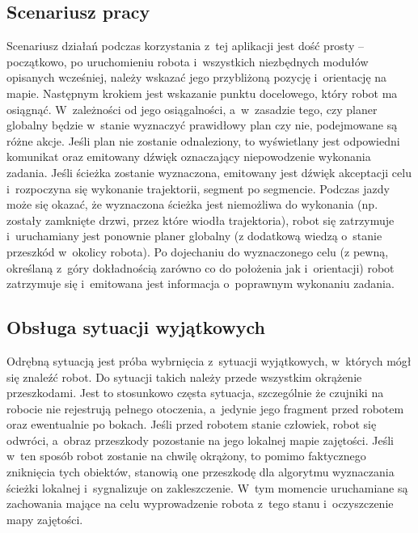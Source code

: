 \subsection{Scenariusz pracy}

Scenariusz działań podczas korzystania z~tej aplikacji jest dość prosty -- początkowo,
po uruchomieniu robota i~wszystkich niezbędnych modułów opisanych wcześniej, należy
wskazać jego przybliżoną pozycję i~orientację na mapie. Następnym krokiem jest
wskazanie punktu docelowego, który robot ma osiągnąć. W~zależności od jego osiągalności,
a~w~zasadzie tego, czy planer globalny będzie w~stanie wyznaczyć prawidłowy plan
czy nie, podejmowane są różne akcje. Jeśli plan nie zostanie odnaleziony, to wyświetlany
jest odpowiedni komunikat oraz emitowany dźwięk oznaczający niepowodzenie wykonania
zadania. Jeśli ścieżka zostanie wyznaczona, emitowany jest dźwięk akceptacji celu
i~rozpoczyna się wykonanie trajektorii, segment po segmencie. Podczas jazdy może się
okazać, że wyznaczona ścieżka jest niemożliwa do wykonania (np. zostały zamknięte
drzwi, przez które wiodła trajektoria), robot się zatrzymuje i~uruchamiany jest
ponownie planer globalny (z dodatkową wiedzą o~stanie przeszkód w~okolicy robota).
Po dojechaniu do wyznaczonego celu (z pewną, określaną z~góry dokładnością zarówno
co do położenia jak i~orientacji) robot zatrzymuje się i~emitowana jest informacja
o~poprawnym wykonaniu zadania.

\subsection{Obsługa sytuacji wyjątkowych}

Odrębną sytuacją jest próba wybrnięcia z~sytuacji wyjątkowych, w~których mógł się
znaleźć robot. Do sytuacji takich należy przede wszystkim okrążenie przeszkodami.
Jest to stosunkowo częsta sytuacja, szczególnie że czujniki na robocie nie rejestrują
pełnego otoczenia, a~jedynie jego fragment przed robotem oraz ewentualnie po bokach.
Jeśli przed robotem stanie człowiek, robot się odwróci, a~obraz przeszkody pozostanie
na jego lokalnej mapie zajętości. Jeśli w~ten sposób robot zostanie na chwilę okrążony,
to pomimo faktycznego zniknięcia tych obiektów, stanowią one przeszkodę dla algorytmu
wyznaczania ścieżki lokalnej i~sygnalizuje on zakleszczenie. W~tym momencie uruchamiane
są zachowania mające na celu wyprowadzenie robota z~tego stanu i~oczyszczenie mapy
zajętości.

